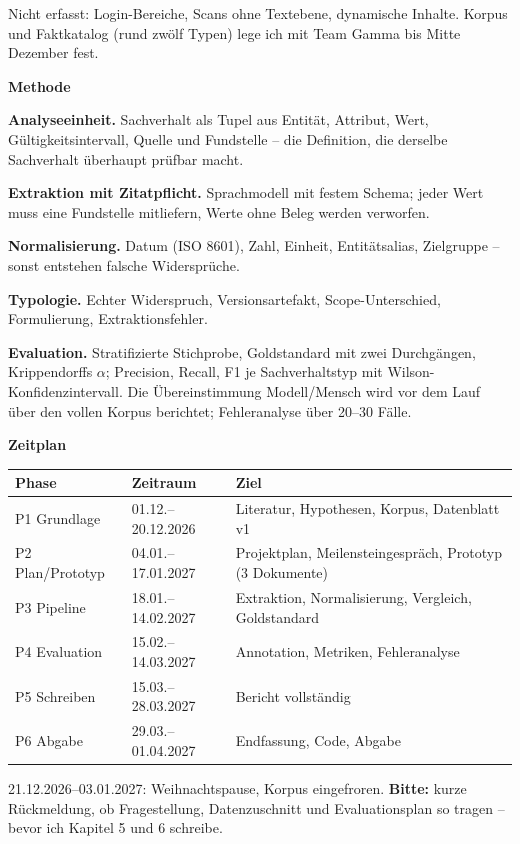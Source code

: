 \documentclass[10pt,a4paper,ngerman]{article}
\newcommand{\abschnitt}[1]{%
  \vspace{3.5pt}%
  {\small\bfseries #1}\par
  \vspace{-3pt}{\color{black!30}\rule{\linewidth}{0.4pt}}\par
  \vspace{-1pt}}
\begin{document}
Nicht erfasst: Login-Bereiche, Scans ohne Textebene, dynamische Inhalte. Korpus und
Faktkatalog (rund zwölf Typen) lege ich mit Team Gamma bis Mitte Dezember fest.

\abschnitt{Methode}

\textbf{Analyseeinheit.} Sachverhalt als Tupel aus Entität, Attribut, Wert,
Gültigkeitsintervall, Quelle und Fundstelle -- die Definition, die
\glqq{}derselbe Sachverhalt\grqq{} überhaupt prüfbar macht.

\textbf{Extraktion mit Zitatpflicht.} Sprachmodell mit festem Schema; jeder Wert muss eine
Fundstelle mitliefern, Werte ohne Beleg werden verworfen.

\textbf{Normalisierung.} Datum (ISO 8601), Zahl, Einheit, Entitätsalias, Zielgruppe --
sonst entstehen falsche Widersprüche.

\textbf{Typologie.} Echter Widerspruch, Versionsartefakt, Scope-Unterschied, Formulierung,
Extraktionsfehler.

\textbf{Evaluation.} Stratifizierte Stichprobe, Goldstandard mit zwei Durchgängen,
Krippendorffs $\alpha$; Precision, Recall, F1 je Sachverhaltstyp mit
Wilson-Konfidenzintervall. Die Übereinstimmung Modell/Mensch wird vor dem Lauf über den
vollen Korpus berichtet; Fehleranalyse über 20--30 Fälle.

\abschnitt{Zeitplan}

{\small
\begin{tabular}{@{}p{3.1cm}p{3.4cm}p{8.6cm}@{}}
\toprule
Phase & Zeitraum & Ziel \\
\midrule
P1 Grundlage     & 01.12.--20.12.2026 & Literatur, Hypothesen, Korpus, Datenblatt v1 \\
P2 Plan/Prototyp & 04.01.--17.01.2027 & Projektplan, Meilensteingespräch, Prototyp (3 Dokumente) \\
P3 Pipeline      & 18.01.--14.02.2027 & Extraktion, Normalisierung, Vergleich, Goldstandard \\
P4 Evaluation    & 15.02.--14.03.2027 & Annotation, Metriken, Fehleranalyse \\
P5 Schreiben     & 15.03.--28.03.2027 & Bericht vollständig \\
P6 Abgabe        & 29.03.--01.04.2027 & Endfassung, Code, Abgabe \\
\bottomrule
\end{tabular}}

\vspace{1pt}
{\footnotesize 21.12.2026--03.01.2027: Weihnachtspause, Korpus eingefroren.
\textbf{Bitte:} kurze Rückmeldung, ob Fragestellung, Datenzuschnitt und Evaluationsplan so
tragen -- bevor ich Kapitel 5 und 6 schreibe.\par}
\end{document}

